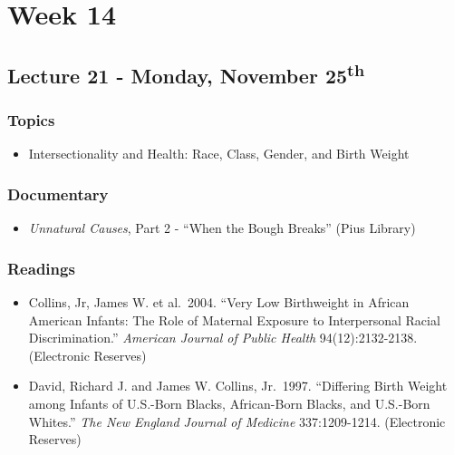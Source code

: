 \documentclass[]{book}
\providecommand{\tightlist}{%
  \setlength{\itemsep}{0pt}\setlength{\parskip}{0pt}}
\begin{document}
\newpage

\hypertarget{week-14}{%
\section*{Week 14}\label{week-14}}

\hypertarget{lecture-21---monday-november-25th}{%
\subsection*{\texorpdfstring{Lecture 21 - Monday, November 25\textsuperscript{th}}{Lecture 21 - Monday, November 25th}}\label{lecture-21---monday-november-25th}}

\hypertarget{topics-26}{%
\subsubsection*{Topics}\label{topics-26}}

\begin{itemize}
\tightlist
\item
  Intersectionality and Health: Race, Class, Gender, and Birth Weight
\end{itemize}

\hypertarget{documentary-3}{%
\subsubsection*{Documentary}\label{documentary-3}}

\begin{itemize}
\tightlist
\item
  \emph{Unnatural Causes}, Part 2 - ``When the Bough Breaks'' (Pius Library)
\end{itemize}

\hypertarget{readings-24}{%
\subsubsection*{Readings}\label{readings-24}}

\begin{itemize}
\tightlist
\item
  Collins, Jr, James W. et al.~2004. ``Very Low Birthweight in African American Infants: The Role of Maternal Exposure to Interpersonal Racial Discrimination.'' \emph{American Journal of Public Health} 94(12):2132-2138. (Electronic Reserves)
\item
  David, Richard J. and James W. Collins, Jr.~1997. ``Differing Birth Weight among Infants of U.S.-Born Blacks, African-Born Blacks, and U.S.-Born Whites.'' \emph{The New England Journal of Medicine} 337:1209-1214. (Electronic Reserves)
\end{itemize}
\end{document}

